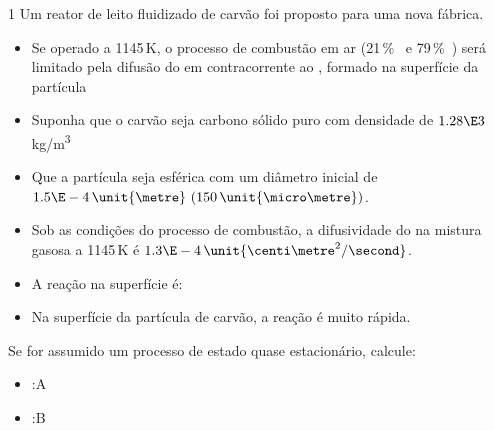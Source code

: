 \documentclass[\mainfilename]{subfiles}
\begin{document}
\begin{questionBox}1{ %
    Um reator de leito fluidizado de carvão foi proposto para uma nova fábrica.
} %
    \begin{itemize}
        \item Se operado a 1145\,\unit{\kelvin}, o processo de combustão em ar (21\,\unit{\percent{}} e 79\,\unit{\percent{}}) será limitado pela difusão do  em contracorrente ao , formado na superfície da partícula
        \item Suponha que o carvão seja carbono sólido puro com densidade de \(1.28\E3\)\,\unit{\kilo\gram/\metre^3}
        \item Que a partícula seja esférica com um diâmetro inicial de \(1.5\E-4\,\unit{\metre}\ (150\,\unit{\micro\metre})\).
        \item Sob as condições do processo de combustão, a difusividade do  na mistura gasosa a 1145\,\unit{\kelvin} é \(1.3\E-4\,\unit{\centi\metre^2/\second}\). 
        \item A reação na superfície é: 
        \item Na superfície da partícula de carvão, a reação é muito rápida.
    \end{itemize}

    Se for assumido um processo de estado quase estacionário, calcule:

    \begin{itemize}
        \item {}:A
        \item {}:B
    \end{itemize}


\end{questionBox}
\end{document}
